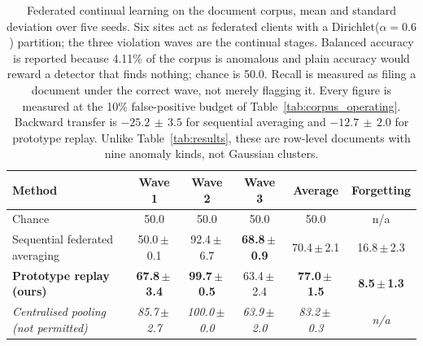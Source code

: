 %

\begin{table}[htbp]
\centering
\caption{Federated continual learning on the document corpus, mean and standard
deviation over five seeds. Six sites act as federated clients with a
Dirichlet($\alpha{=}0.6$) partition; the three violation waves are the continual
stages. Balanced accuracy is reported because 4.11\% of the corpus is anomalous
and plain accuracy would reward a detector that finds nothing; chance is 50.0.
Recall is measured as filing a document under the correct wave, not merely
flagging it. Every figure is measured at the 10\% false-positive budget of
Table~\ref{tab:corpus_operating}. Backward transfer is $-25.2\,\pm\,3.5$ for
sequential averaging and $-12.7\,\pm\,2.0$ for prototype replay. Unlike
Table~\ref{tab:results}, these are row-level documents with nine anomaly kinds,
not Gaussian clusters.}
\label{tab:corpus}
\small
\setlength{\tabcolsep}{4.5pt}
\begin{tabular}{@{}l c c c c c@{}}
\toprule
\textbf{Method} & \textbf{Wave 1} & \textbf{Wave 2} & \textbf{Wave 3} &
\textbf{Average} & \textbf{Forgetting} \\
\midrule
Chance & 50.0 & 50.0 & 50.0 & 50.0 & n/a \\
Sequential federated averaging & 50.0\,$\pm$\,0.1 & 92.4\,$\pm$\,6.7 &
  \textbf{68.8\,$\pm$\,0.9} & 70.4\,$\pm$\,2.1 & 16.8\,$\pm$\,2.3 \\
\textbf{Prototype replay (ours)} & \textbf{67.8\,$\pm$\,3.4} &
  \textbf{99.7\,$\pm$\,0.5} & 63.4\,$\pm$\,2.4 & \textbf{77.0\,$\pm$\,1.5} &
  \textbf{8.5\,$\pm$\,1.3} \\
\midrule
\textit{Centralised pooling (not permitted)} & \textit{85.7\,$\pm$\,2.7} &
  \textit{100.0\,$\pm$\,0.0} & \textit{63.9\,$\pm$\,2.0} & \textit{83.2\,$\pm$\,0.3} &
  \textit{n/a} \\
\bottomrule
\end{tabular}
\end{table}

